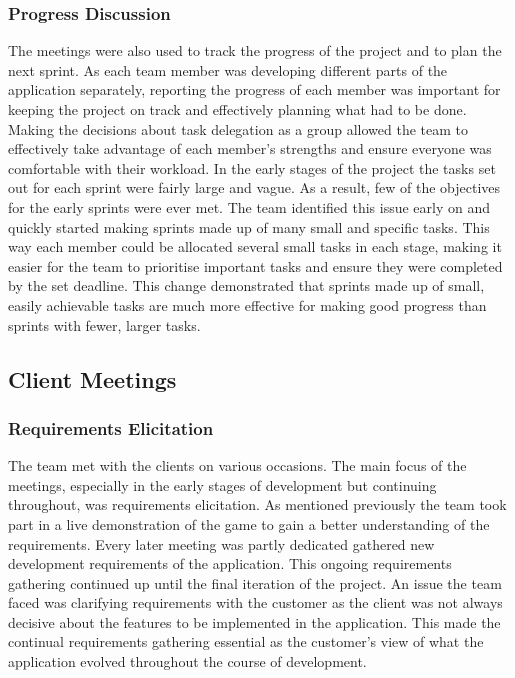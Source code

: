 \documentclass{l3proj}
\begin{document}
\subsubsection{Progress Discussion}
The meetings were also used to track the progress of the project and to plan the next sprint. As each team member was developing different parts of the application separately, reporting the progress of each member was important for keeping the project on track and effectively planning what had to be done. Making the decisions about task delegation as a group allowed the team to effectively take advantage of each member's strengths and ensure everyone was comfortable with their workload. In the early stages of the project the tasks set out for each sprint were fairly large and vague. As a result, few of the objectives for the early sprints were ever met. The team identified this issue early on and quickly started making sprints made up of many small and specific tasks. This way each member could be allocated several small tasks in each stage, making it easier for the team to prioritise important tasks and ensure they were completed by the set deadline. This change demonstrated that sprints made up of small, easily achievable tasks are much more effective for making good progress than sprints with fewer, larger tasks.

\subsection{Client Meetings}

\subsubsection{Requirements Elicitation}
The team met with the clients on various occasions. The main focus of the meetings, especially in the early stages of development but continuing throughout, was requirements elicitation. As mentioned previously the team took part in a live demonstration of the game to gain a better understanding of the requirements. Every later meeting was partly dedicated gathered new development requirements of the application. This ongoing requirements gathering continued up until the final iteration of the project. An issue the team faced was clarifying requirements with the customer as the client was not always decisive about the features to be implemented in the application. This made the continual requirements gathering essential as the customer's view of what the application evolved throughout the course of development.
\end{document}
